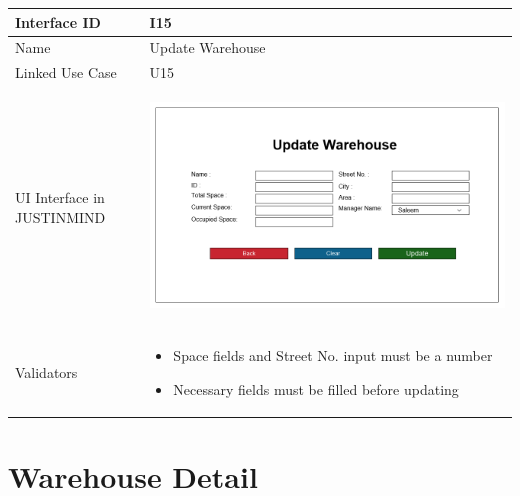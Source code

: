 \documentclass[12pt,a4paper]{report}
\begin{document}
\begin{tabular}{ | m{3cm} | m{12cm}| } \hline

Interface ID & I15  \\\hline

Name  &  Update Warehouse \\ \hline

Linked Use Case & U15 \\ \hline

UI Interface in JUSTINMIND & \begin{center} \includegraphics[scale=0.3]{./UIs for Latex Reports/UI-015 EditWarehouse@1x.png}\end{center}  \\ \hline

Validators & 
\begin{itemize}
\item   Space fields and Street No. input must be a number
\item  Necessary fields must be filled before updating


\end{itemize}
\\ \hline

\end{tabular} 
\section{Warehouse Detail }
\end{document}
